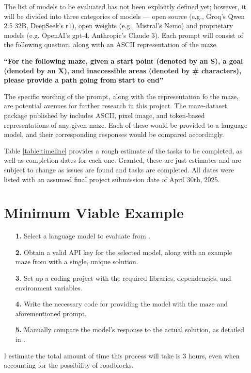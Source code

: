 \documentclass[conference]{IEEEtran}
\begin{document}
The list of models to be evaluated has not been explicitly defined yet; however, it will be divided into three categories of models --- open source (e.g., Groq's Qwen 2.5 32B, DeepSeek's r1), open weights (e.g., Mistral's Nemo) and proprietary models (e.g. OpenAI's gpt-4, Anthropic's Claude 3). Each prompt will consist of the following question, along with an ASCII representation of the maze.

\begin{center}
\textbf{``For the following maze, given a start point (denoted by an S), a goal (denoted by an X), and inaccessible areas (denoted by \# characters), please provide a path going from start to end''}
\end{center}

The specific wording of the prompt, along with the representation fo the maze, are potential avenues for further research in this project. The maze-dataset package published by \cite{int1} includes ASCII, pixel image, and token-based representations of any given maze. Each of these would be provided to a language model, and their corresponding responses would be compared accordingly.

Table \ref{table:timeline} provides a rough estimate of the tasks to be completed, as well as completion dates for each one. Granted, these are just estimates and are subject to change as issues are found and tasks are completed. All dates were listed with an assumed final project submission date of April 30th, 2025.

\section{Minimum Viable Example}
\begin{enumerate}
    \item[\textbf{1.}] Select a language model to evaluate from \cite{ext4}.
    \item[\textbf{2.}] Obtain a valid API key for the selected model, along with an example maze from \cite{int1} with a single, unique solution.
    \item[\textbf{3.}] Set up a coding project with the required libraries, dependencies, and environment variables.
    \item[\textbf{4.}] Write the necessary code for providing the model with the maze and aforementioned prompt.
    \item[\textbf{5.}] Manually compare the model's response to the actual solution, as detailed in \cite{int1}.
\end{enumerate}
I estimate the total amount of time this process will take is 3 hours, even when accounting for the possibility of roadblocks.
\end{document}
